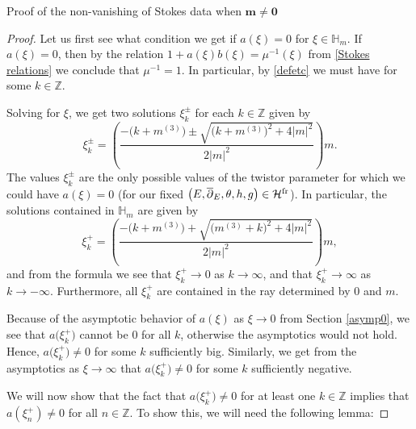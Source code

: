\begin{subsubsection}{Proof of the non-vanishing of Stokes data when $\boldsymbol{m\neq 0}$}
\begin{proof}
Let us first see what condition we get if $a(\xi)=0$ for $\xi \in \mathbb{H}_m$. If $a(\xi)=0$, then by the relation $1+a(\xi)b(\xi)=\mu^{-1}(\xi)$ from \eqref{Stokes relations} we conclude that $\mu^{-1}=1$. In particular, by \eqref{defetc} we must have
for some $k \in \mathbb{Z}$.

Solving for $\xi$, we get two solutions $\xi^{\pm}_k$ for each $k \in \mathbb{Z}$ given by
\begin{equation*}
 \xi_k^{\pm}=\left(\frac{-\bigl(k+m^{(3)}\bigr)\pm \sqrt{\bigl(k+m^{(3)}\bigr)^2+4|m|^2}}{2|m|^2}\right)m.
\end{equation*}
The values $\xi_k^{\pm}$ are the only possible values of the twistor parameter for which we could have $a(\xi)=0$ \big(for our fixed $\bigl(E,\overline{\partial}_E,\theta, h, g\bigr) \in \mathcal{H}^{{\rm fr}}$\big). In particular, the solutions contained in $\mathbb{H}_m$ are given by
\begin{equation*}
 \xi_k^{+}=\left(\frac{-\bigl(k+m^{(3)}\bigr)+ \sqrt{\bigl(m^{(3)}+k\bigr)^2+4|m|^2}}{2|m|^2}\right)m,
\end{equation*}
and from the formula we see that $\xi_k^{+} \to 0$ as $k\to \infty$, and that $\xi_k^{+} \to \infty$ as $k \to -\infty$. Furthermore, all $\xi_k^{+}$ are contained in the ray determined by $0$ and $m$.

Because of the asymptotic behavior of $a(\xi)$ as $\xi \to 0$ from Section \ref{asymp0}, we see that $a\bigl(\xi_k^{+}\bigr)$ cannot be $0$ for all $k$, otherwise the asymptotics would not hold. Hence, $a\bigl(\xi_k^{+}\bigr)\neq 0$ for some $k$ sufficiently big. Similarly, we get from the asymptotics as $\xi \to \infty$ that $a\bigl(\xi_k^{+}\bigr)\neq 0$ for some $k$ sufficiently negative.

We will now show that the fact that $a\bigl(\xi_k^{+}\bigr)\neq 0$ for at least one $k \in \mathbb{Z}$ implies that $a(\xi_n^{+})\neq 0$ for all $n\in \mathbb{Z}$. To show this, we will need the following lemma:


\end{proof}
\end{subsubsection}
